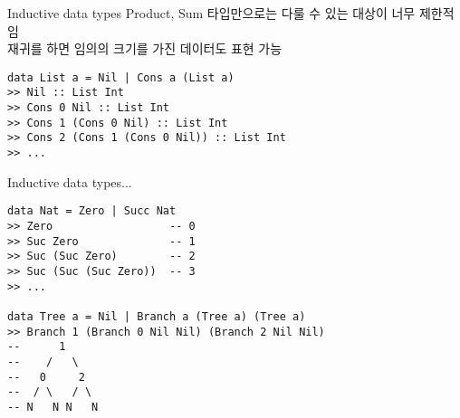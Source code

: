 \documentclass[t]{beamer}
\begin{document}
% 

\begin{frame}[fragile]{Inductive data types}
  Product, Sum 타입만으로는 다룰 수 있는 대상이 너무 제한적임\newline \\
  \pause
  재귀를 하면 임의의 크기를 가진 데이터도 표현 가능
\begin{verbatim}
data List a = Nil | Cons a (List a)
>> Nil :: List Int
>> Cons 0 Nil :: List Int
>> Cons 1 (Cons 0 Nil) :: List Int
>> Cons 2 (Cons 1 (Cons 0 Nil)) :: List Int
>> ...
\end{verbatim}
\end{frame}

\begin{frame}[fragile]{Inductive data types...}
\begin{verbatim}
data Nat = Zero | Succ Nat
>> Zero                  -- 0
>> Suc Zero              -- 1
>> Suc (Suc Zero)        -- 2
>> Suc (Suc (Suc Zero))  -- 3
>> ...

data Tree a = Nil | Branch a (Tree a) (Tree a)
>> Branch 1 (Branch 0 Nil Nil) (Branch 2 Nil Nil)
--      1
--    /   \
--   0     2
--  / \   / \
-- N   N N   N
\end{verbatim}
\end{frame}
\end{document}
